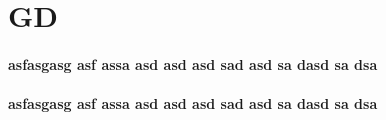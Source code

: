 \section{GD}

\paragraph
	{
	asfasgasg asf assa asd asd asd sad 
	asd sa dasd sa dsa
	}
\paragraph
	{
	asfasgasg asf assa asd asd asd sad 
	asd sa dasd sa dsa
	}